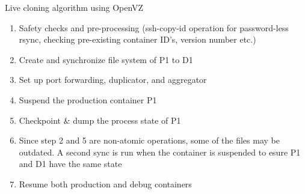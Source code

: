 \begin{algorithm}[ht!]
  \caption{Live cloning algorithm using OpenVZ} 
  \label{algCloning}
  \begin{enumerate}[topsep=0pt,itemsep=-1ex,partopsep=1ex,parsep=1ex]
  \item Safety checks and pre-processing (ssh-copy-id operation for password-less rsync, checking pre-existing container ID's, version number etc.) 
  \item Create and synchronize file system of P1 to D1  
  \item Set up port forwarding, duplicator, and aggregator
  \item Suspend the production container P1
  \item Checkpoint \& dump the process state of P1
  \item Since step 2 and 5 are non-atomic operations, some of the files may be outdated.
A second sync is run when the container is suspended to esure P1 and D1 have the same state
  \item Resume both production and debug containers
  \end{enumerate}
\end{algorithm}


